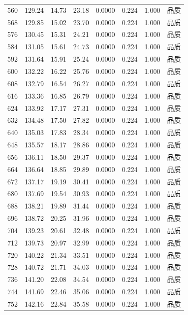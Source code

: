 \begin{longtable}{rrrrrrrr}
560 & 129.24 & 14.73 & 23.18 & 0.0000 & 0.224 & 1.000 & 品质 \\
568 & 129.85 & 15.02 & 23.70 & 0.0000 & 0.224 & 1.000 & 品质 \\
576 & 130.45 & 15.31 & 24.21 & 0.0000 & 0.224 & 1.000 & 品质 \\
584 & 131.05 & 15.61 & 24.73 & 0.0000 & 0.224 & 1.000 & 品质 \\
592 & 131.64 & 15.91 & 25.24 & 0.0000 & 0.224 & 1.000 & 品质 \\
600 & 132.22 & 16.22 & 25.76 & 0.0000 & 0.224 & 1.000 & 品质 \\
608 & 132.79 & 16.54 & 26.27 & 0.0000 & 0.224 & 1.000 & 品质 \\
616 & 133.36 & 16.85 & 26.79 & 0.0000 & 0.224 & 1.000 & 品质 \\
624 & 133.92 & 17.17 & 27.31 & 0.0000 & 0.224 & 1.000 & 品质 \\
632 & 134.48 & 17.50 & 27.82 & 0.0000 & 0.224 & 1.000 & 品质 \\
640 & 135.03 & 17.83 & 28.34 & 0.0000 & 0.224 & 1.000 & 品质 \\
648 & 135.57 & 18.17 & 28.86 & 0.0000 & 0.224 & 1.000 & 品质 \\
656 & 136.11 & 18.50 & 29.37 & 0.0000 & 0.224 & 1.000 & 品质 \\
664 & 136.64 & 18.85 & 29.89 & 0.0000 & 0.224 & 1.000 & 品质 \\
672 & 137.17 & 19.19 & 30.41 & 0.0000 & 0.224 & 1.000 & 品质 \\
680 & 137.69 & 19.54 & 30.93 & 0.0000 & 0.224 & 1.000 & 品质 \\
688 & 138.21 & 19.89 & 31.44 & 0.0000 & 0.224 & 1.000 & 品质 \\
696 & 138.72 & 20.25 & 31.96 & 0.0000 & 0.224 & 1.000 & 品质 \\
704 & 139.23 & 20.61 & 32.48 & 0.0000 & 0.224 & 1.000 & 品质 \\
712 & 139.73 & 20.97 & 32.99 & 0.0000 & 0.224 & 1.000 & 品质 \\
720 & 140.22 & 21.34 & 33.51 & 0.0000 & 0.224 & 1.000 & 品质 \\
728 & 140.72 & 21.71 & 34.03 & 0.0000 & 0.224 & 1.000 & 品质 \\
736 & 141.20 & 22.08 & 34.54 & 0.0000 & 0.224 & 1.000 & 品质 \\
744 & 141.69 & 22.46 & 35.06 & 0.0000 & 0.224 & 1.000 & 品质 \\
752 & 142.16 & 22.84 & 35.58 & 0.0000 & 0.224 & 1.000 & 品质 \\

\end{longtable}

